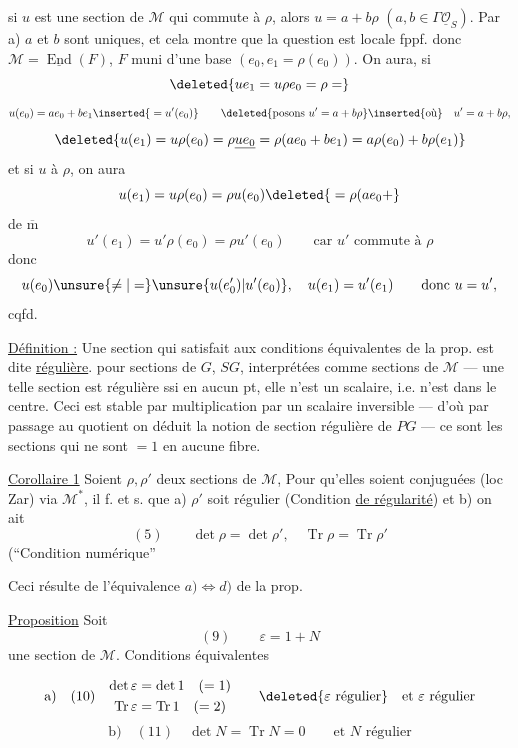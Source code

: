 

si $u$ est une section de $\mathcal M$  qui commute à $\rho$, alors $u=a+b\rho$ $(a,b\in\Gamma\underline{\mathcal O}_S)$. Par a) $a$ et $b$ sont uniques, et cela montre que la question est locale fppf.  donc $\mathcal M=\underline{\operatorname{End}}(F)$, $F$ muni d'une base $(e_0,e_1=\rho(e_0))$.  On aura, si
\[
\deleted{ue_1=u\rho e_0=\rho=}
\]
\[
u(e_0)=ae_0+be_1\inserted{{}=u'(e_0)}\qquad
\deleted{\text{posons }u'=a+b\rho}\inserted{\text{où}}\quad u'=a+b\rho,
\]
\[
\deleted{u(e_1)=u\rho(e_0)=\rho\underline{ue_0}=\rho(ae_0+be_1)=a\rho(e_0)+b\rho(e_1)}
\]
et si $u$   à $\rho$, on aura
\[
u(e_1)=u\rho(e_0)=\rho u(e_0)\deleted{{}=\rho(ae_0+}
\]
de $\overline{\mathrm m}$
\[
u'(e_1)=u'\rho(e_0)=\rho u'(e_0)\qquad\text{car }u'\text{ commute à }\rho
\]
donc
\[
u(e_0)\unsure{\neq|=}\unsure{u(e'_0)|u'(e_0)},\quad u(e_1)=u'(e_1)\qquad\text{donc }u=u',
\]
cqfd.

\uline{Définition :} Une section  qui satisfait aux conditions équivalentes de la prop. est dite \uline{régulière}.  pour sections de $G$, $SG$, interprétées comme sections de $\mathcal M$ ---  une telle section est régulière ssi en aucun pt, elle n'est un scalaire, i.e. n'est dans le centre. Ceci est stable par multiplication par un scalaire inversible --- d'où par passage au quotient on déduit la notion de section régulière de $PG$ --- ce sont les sections qui ne sont $=1$ en aucune fibre.

\uline{Corollaire 1} Soient $\rho,\rho'$ deux sections  de $\mathcal M$,  Pour qu'elles soient conjuguées (loc Zar) via $\mathcal M^*$, il f. et s. que \deleted{$\rho$} a) $\rho'$ soit régulier (Condition \uline{de régularité}) et b) on ait
\[
(5)\qquad \det\rho=\det\rho',\quad \operatorname{Tr}\rho=\operatorname{Tr}\rho'
\]
(``Condition numérique''



Ceci résulte de l'équivalence $a)\Longleftrightarrow d)$ de la prop.

\uline{Proposition} Soit
\[
(9)\qquad \varepsilon=1+N
\]
une section de $\mathcal M$. Conditions équivalentes

\[
\text{a)}\quad (10)\quad
\begin{gathered}
\det\varepsilon=\det1\quad(=1)\\
\operatorname{Tr}\varepsilon=\operatorname{Tr}1\quad(=2)
\end{gathered}
\qquad \deleted{\varepsilon\text{ régulier}}\quad\text{et }\varepsilon\text{ régulier}
\]
\[
\text{b)}\quad (11)\quad \det N=\operatorname{Tr}N=0\qquad\text{et }N\text{ régulier}
\]

